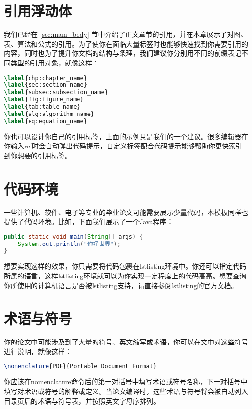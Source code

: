\section{引用浮动体}

我们已经在 \ref{sec:main_body} 节中介绍了正文章节的引用，并在本章展示了对图、表、算法和公式的引用。为了使你在面临大量标签时也能够快速找到你需要引用的内容，同时也为了提升你文档的结构与条理，我们建议你分别用不同的前缀表记不同类型的引用对象，就像这样：

\begin{tcolorbox}
\begin{lstlisting}[language=TeX]
\label{chp:chapter_name}
\label{sec:section_name}
\label{subsec:subsection_name}
\label{fig:figure_name}
\label{tab:table_name}
\label{alg:algorithm_name}
\label{eq:equation_name}
\end{lstlisting}
\end{tcolorbox}

\noindent 你也可以设计你自己的引用标签，上面的示例只是我们的一个建议。很多编辑器在你输入{\codefont ref}时会自动弹出代码提示，自定义标签配合代码提示能够帮助你更快索引到你想要的引用标签。

\section{代码环境}

一些计算机、软件、电子等专业的毕业论文可能需要展示少量代码，本模板同样也提供了代码环境。比如，下面我们展示了一个Java程序：

\begin{tcolorbox}
\begin{lstlisting}[language=Java]
public static void main(String[] args) {
    System.out.println("你好世界");
}
\end{lstlisting}
\end{tcolorbox}

想要实现这样的效果，你只需要将代码包裹在{\codefont lstlisting}环境中。你还可以指定代码所属的语言，这样{\codefont lstlisting}环境就可以为你实现一定程度上的代码高亮。想要查询你所使用的计算机语言是否被{\codefont lstlisting}支持，请直接参阅{\codefont lstlisting}的官方文档。

\section{术语与符号}

你的论文中可能涉及到了大量的符号、英文缩写或术语，你可以在文中对这些符号进行说明，就像这样：

\begin{tcolorbox}
\begin{lstlisting}[language=TeX]
\nomenclature{PDF}{Portable Document Format}
\end{lstlisting}
\end{tcolorbox}

\noindent 你应该在{\codefont nomenclature}命令后的第一对括号中填写术语或符号名称，下一对括号中填写对术语或符号的解释或定义。当论文编译时，这些术语与符号将会被自动列入目录页后的术语与符号表，并按照英文字母序排列。
